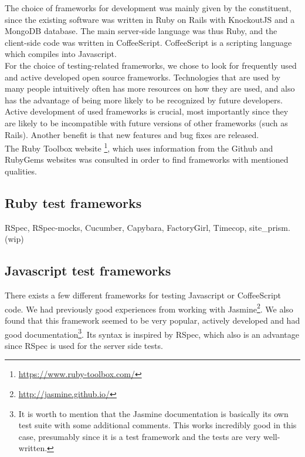 \MakeShortVerb{\|}
\label{sec:choices}

The choice of frameworks for development was mainly given by the
constituent, since the existing software was written in Ruby on Rails
with KnockoutJS and a MongoDB database. The main server-side language
was thus Ruby, and the client-side code was written in CoffeeScript.
CoffeeScript is a scripting language which compiles into Javascript.\\

For the choice of testing-related frameworks, we chose to look for
frequently used and active developed open source frameworks.
Technologies that are used by many people intuitively often has more
resources on how they are used, and also has the advantage of being more
likely to be recognized by future developers. Active development of used
frameworks is crucial, most importantly since they are likely to be
incompatible with future versions of other frameworks (such as Rails).
Another benefit is that new features and bug fixes are released.\\

The Ruby Toolbox website \footnote{\url{https://www.ruby-toolbox.com/}},
which uses information from the Github and RubyGems websites was
consulted in order to find frameworks with mentioned qualities.\\

\subsection{Ruby test frameworks}
RSpec, RSpec-mocks, Cucumber, Capybara, FactoryGirl, Timecop, site\_prism. (wip)


\subsection{Javascript test frameworks}

There exists a few different frameworks for testing Javascript or
CoffeeScript code. We had previously good experiences from working with
Jasmine\footnote{\url{http://jasmine.github.io/}}. We also found that
this framework seemed to be very popular, actively developed and had
good documentation\footnote{It is worth to mention that the Jasmine
documentation is basically its own test suite with some additional
comments. This works incredibly good in this case, presumably since it
is a test framework and the tests are very well-written.}. Its syntax is
inspired by RSpec, which also is an advantage since RSpec is used for
the server side tests.\\

